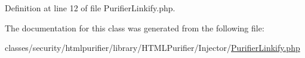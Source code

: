 Definition at line 12 of file Purifier\+Linkify.\+php.



The documentation for this class was generated from the following file\+:\begin{DoxyCompactItemize}
\item 
classes/security/htmlpurifier/library/\+H\+T\+M\+L\+Purifier/\+Injector/\hyperlink{PurifierLinkify_8php}{Purifier\+Linkify.\+php}\end{DoxyCompactItemize}
